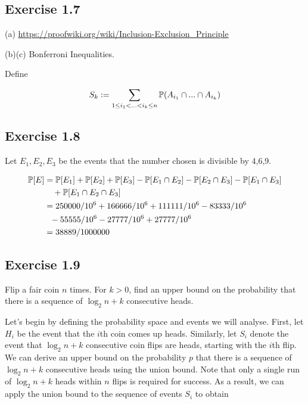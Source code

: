 \subsection*{Exercise 1.7}

\noindent (a) \url{https://proofwiki.org/wiki/Inclusion-Exclusion_Principle}

\noindent (b)(c) Bonferroni Inequalities.

Define 

\begin{equation*}
S_k := \sum_{1\leq i_1 < ... <  i_k \leq n} \P(A_{i_1} \cap ... \cap A_{i_k})
\end{equation*}


\subsection*{Exercise 1.8}

Let $E_1, E_2, E_3$ be the events that the number chosen is divisible by 4,6,9.

\begin{equation*}
\begin{split}
\P[E] & = \P[E_1] + \P[E_2] + \P[E_3] - \P[E_1 \cap E_2]
- \P[E_2 \cap E_3] - \P[E_1 \cap E_3] \\
& \ \ \ + \P[E_1\cap E_2 \cap E_3] \\
& =  250000/10^6 + 166666/10^6 + 111111/10^6 - 83333/10^6 \\
& \ \ - 55555/10^6 - 27777/10^6 + 27777/10^6\\
& = 38889/1000000
\end{split}
\end{equation*}

\subsection*{Exercise 1.9}

Flip a fair coin $n$ times.
For $k>0$, find an upper bound on the probability that there is a sequence of $\log_2 n + k$ consecutive heads.

Let's begin by defining the probability space and events we will analyse. First, let
$H_i$ be the event that the $i$th coin comes up heads. Similarly, let
$S_i$ denote the event that $\log_2 n + k$ consecutive coin flips are heads, starting with the
$i$th flip. We can derive an upper bound on the probability $p$ that there is a sequence of 
$\log_2 n + k$ consecutive heads using the union bound.
Note that only a single run of $\log_2 n + k$ heads within $n$
flips is required for success. As a result,
we can apply the union bound to the sequence of events $S_i$
to obtain

